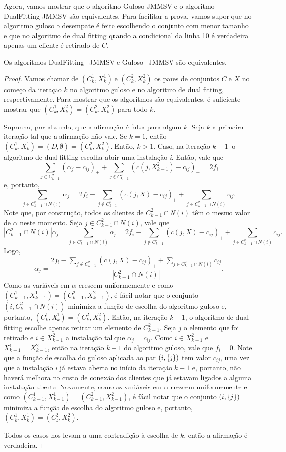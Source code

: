 Agora, vamos mostrar que o algoritmo {Guloso-JMMSV} e o algoritmo {\sc DualFitting-JMMSV} são equivalentes. Para facilitar a prova, vamos supor que no algoritmo guloso o desempate é feito escolhendo o conjunto com menor tamanho e que no algoritmo de dual fitting quando a condicional da linha 10 é verdadeira apenas um cliente é retirado de $C$.

\begin{theorem}
Os algoritmos {\sc DualFitting\_JMMSV} e {\sc Guloso\_JMMSV} são equivalentes.
\end{theorem}

\begin{proof}
Vamos chamar de $(C_k^1,X_k^1)$ e $(C_k^2,X_k^2)$ os pares de conjuntos $C$ e $X$ no começo da iteração $k$ no algoritmo guloso e no algoritmo de dual fitting, respectivamente. Para mostrar que os algoritmos são equivalentes, é suficiente mostrar que $(C_k^1,X_k^2) = (C_k^2,X_k^2)$ para todo $k$.

Suponha, por absurdo, que a afirmação é falsa para algum $k$. Seja $k$ a primeira iteração tal que a afirmação não vale. Se $k=1$, então $(C_k^1,X_k^1) = (D,\emptyset) = (C_k^2,X_k^2)$.
Então, $k>1$.
Caso, na iteração $k-1$, o algoritmo de dual fitting escolha abrir uma instalação $i$. Então, vale que 
\[
    \sum_{j \in C_{k-1}^2} (\alpha_j - c_{ij})_+ + \sum_{j \not \in C_{k-1}^2}(c(j,X_{k-1}^2) - c_{ij})_+ = 2f_i
\] 
e, portanto,
\[
    \sum_{j \in C_{k-1}^2 \cap N(i)} \alpha_j = 2f_i - \sum_{j \not \in C_{k-1}^2} (c(j,X)- c_{ij})_+  + \sum_{j \in  C_{k-1}^2 \cap N(i)} c_{ij}. 
\]
Note que, por construção, todos os clientes de  $C_{k-1}^2 \cap N(i)$ têm o mesmo valor de $\alpha$ neste momento. Seja $j \in C_{k-1}^2 \cap N(i)$, vale que
\[
    |C_{k-1}^2 \cap N(i)| \alpha_j = \sum_{j \in C_{k-1}^2 \cap N(i)} \alpha_j = 2f_i - \sum_{j \not \in C_{k-1}^2} (c(j,X)- c_{ij})_+  + \sum_{j \in  C_{k-1}^2 \cap N(i)} c_{ij}.
\]
Logo, 
\[
    \alpha_j = \frac{ 2f_i - \sum_{j \not \in C_{k-1}^2} (c(j,X)- c_{ij})_+  + \sum_{j \in  C_{k-1}^2 \cap N(i)} c_{ij}}{|C_{k-1}^2 \cap N(i)|}.
\]
Como as variáveis em $\alpha$ crescem uniformemente e como $(C_{k-1}^1,X_{k-1}^1) = (C_{k-1}^2,X_{k-1}^2)$, é fácil notar que o conjunto $(i,C_{k-1}^2 \cap N(i))$ minimiza a função de escolha do algoritmo guloso e, portanto, $(C_{k}^1,X_{k}^1) = (C_{k}^2,X_{k}^2)$. Então, na iteração $k-1$, o algoritmo de dual fitting escolhe apenas retirar um elemento de $C_{k-1}^2$. Seja $j$ o elemento que foi retirado e $i \in X_{k-1}^2$ a instalação tal que $\alpha_j = c_{ij}$. Como $i \in X_{k-1}^2$ e $X_{k-1}^1 = X_{k-1}^2$, então na iteração $k-1$ do algoritmo guloso, vale que $f_i = 0$. Note que a função de escolha do guloso aplicada ao par $(i,\{j\})$ tem valor $c_{ij}$, uma vez que a instalação $i$ já estava aberta no início da iteração $k-1$ e, portanto, não haverá melhora no custo de conexão dos clientes que já estavam ligados a alguma instalação aberta. Novamente, como as variáveis em $\alpha$ crescem uniformemente e como $(C_{k-1}^1,X_{k-1}^1) = (C_{k-1}^2,X_{k-1}^2)$, é fácil notar que o conjunto $(i,\{j\})$ minimiza a função de escolha do algoritmo guloso e, portanto, $(C_{k}^1,X_{k}^1) = (C_{k}^2,X_{k}^2)$.

Todos os casos nos levam a uma contradição à escolha de $k$, então a afirmação é verdadeira.   
\end{proof}